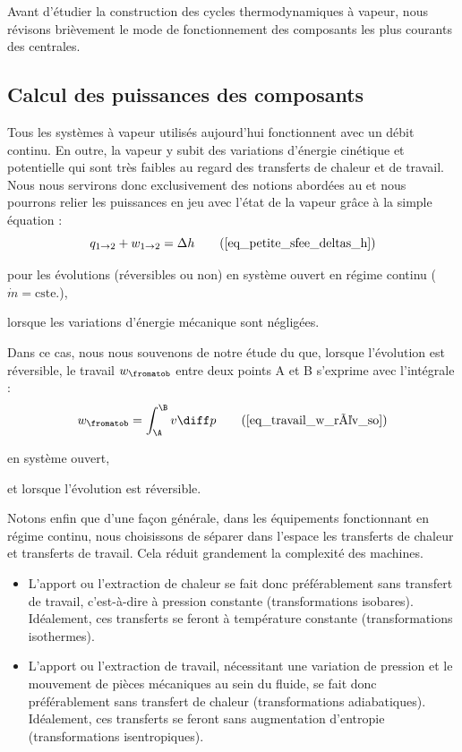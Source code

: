 	Avant d’étudier la construction des cycles thermodynamiques à vapeur, nous révisons brièvement le mode de fonctionnement des composants les plus courants des centrales.

	\subsection{Calcul des puissances des composants}
	\label{ch_expressions_puissances_vapeur}

		Tous les systèmes à vapeur utilisés aujourd’hui fonctionnent avec un débit continu. En outre, la vapeur y subit des variations d’énergie cinétique et potentielle qui sont très faibles au regard des transferts de chaleur et de travail. Nous nous servirons donc exclusivement des notions abordées au \courstrois et nous pourrons relier les puissances en jeu avec l’état de la vapeur grâce à la simple équation :
		\begin{equation}
				q_{1 \to 2} + w_{1 \to 2} = \Delta h 	\tag{\ref{eq_petite_sfee_deltas_h}}
		\end{equation}
		\begin{equationterms}
			\item pour les évolutions (réversibles ou non) en système ouvert en régime continu ($\dot m = \text{cste.}$),
			\item lorsque les variations d’énergie mécanique sont négligées.
		\end{equationterms}

		Dans ce cas, nous nous souvenons de notre étude du \courstroisshort que, lorsque l’évolution est réversible, le travail $w_\fromatob$ entre deux points A et B s’exprime avec l’intégrale :
		\begin{equation}
				w_\fromatob =  \int_\A^\B v  \diff p  		\tag{\ref{eq_travail_w_rév_so}}
		\end{equation}
		\begin{equationterms}
			\item en système ouvert,
			\item et lorsque l’évolution est réversible.
		\end{equationterms}

		Notons enfin que d’une façon générale, dans les équipements fonctionnant en régime continu, nous choisissons de séparer dans l’espace les transferts de chaleur et transferts de travail. Cela réduit grandement la complexité des machines.

		\begin{itemize}
			\item L’apport ou l’extraction de chaleur se fait donc préférablement sans transfert de travail, c’est-à-dire à pression constante (transformations isobares). Idéalement, ces transferts se feront à température constante (transformations isothermes).
			\item L’apport ou l’extraction de travail, nécessitant une variation de pression et le mouvement de pièces mécaniques au sein du fluide, se fait donc préférablement sans transfert de chaleur (transformations adiabatiques). Idéalement, ces transferts se feront sans augmentation d’entropie (transformations isentropiques).
		\end{itemize}




